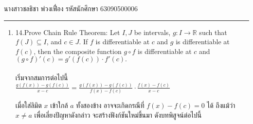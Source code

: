 \documentclass[12pt, a4paper]{article}
\begin{document}
\raggedleft นางสาวชลธิชา พ่วงเฟื่อง  รหัสนักศึกษา 63090500006 \\[12pt]
\hrule\vspace{12pt}
\raggedright

\begin{enumerate}
    \item 14.Prove Chain Rule Theorem: Let $I,J$ be intervals, $g : I\rightarrow \mathbb{R} $ such that $f\left ( J \right )\subseteq I$, and $ c\in J.$
    If $f$ is differentiable at $c$ and $g$ is differentiable at $f\left ( c \right )$, then the composite function $g\circ f$
    is differentiable at $c $ and $ {\left (g\circ f  \right )}'\left ( c \right )={g}'\left ( f\left ( c \right ) \right )\cdot {f}'\left ( c \right ).$
    \\ \indent \\
    เริ่มจากสมการต่อไปนี้\\
    \hspace{1cm}$\frac{g\left (f\left ( x \right )  \right )-g\left ( f\left ( c \right ) \right )}{x-c}=\frac{g\left (f\left ( x \right )  \right )-g\left ( f\left ( c \right ) \right )}{f\left (x  \right )-f\left (c  \right )}\cdot \frac{f\left (x  \right )-f\left (c  \right ) }{x-c}$

    เมื่อใส่ลิมิต $x$ เข้าใกล้ $a$ ทั้งสองข้าง อาจจะเกิดกรณีที่ $f\left ( x \right )-f\left ( c \right )=0$ ได้ ถึงแม้ว่า $ x\neq a $ เพื่อเลี่ยงปัญหาดังกล่าว
    จะสร้างฟังก์ชันใหม่ขึ้นมา ดังบทพิสูจน์ต่อไปนี้ \\   



\end{enumerate}
\end{document}
